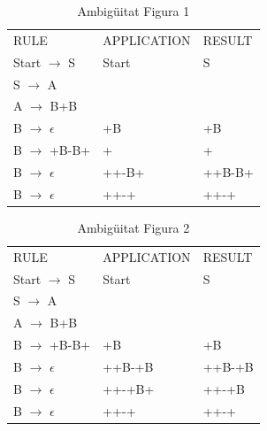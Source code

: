 \documentclass[12pt,a4paper]{report}
\begin{document}
\begin{table}[ht]
\caption{\label{tab:table-name} Ambigüitat Figura 1}
\centering
\begin{tabular}{lll}
\hline
\hline
RULE                       & APPLICATION                        & RESULT \\
Start $\rightarrow$ S      & Start                              & S      \\
S $\rightarrow$ A          & \color{Blue}{S} & \color{Blue}{A}      \\
A $\rightarrow$ B+B        & \color{Blue}{A}                                  & \color{Blue}{B+B}    \\
B $\rightarrow$ $\epsilon$ & \color{Blue}{B}+B                                & +B     \\
B $\rightarrow$ +B-B+      & +\color{Blue}{B}                                 & +\color{Blue}{+B-B+} \\
B $\rightarrow$ $\epsilon$ & ++\color{Blue}{B}-B+                             & ++B-B+ \\
B $\rightarrow$ $\epsilon$ & ++-\color{Blue}{B}+                              & ++-+  \\ \hline
\end{tabular}
\end{table}

\begin{table}[ht]
\caption{\label{tab:table-name} Ambigüitat Figura 2}
\centering
\begin{tabular}{lll}
\hline
\hline
RULE                       & APPLICATION                        & RESULT  \\
Start $\rightarrow$ S      & Start                              & S       \\
S $\rightarrow$ A          & \color{Blue}{S} & \color{Blue}{A}       \\
A $\rightarrow$ B+B        & \color{Blue}{A}                                  & \color{Blue}{B+B}     \\
B $\rightarrow$ +B-B+      & \color{Blue}{B}+B                                & \color{Blue}{+B+B-}+B \\
B $\rightarrow$ $\epsilon$ & +\color{Blue}{B}+B-+B                            & ++B-+B  \\
B $\rightarrow$ $\epsilon$ & ++\color{Blue}{B}-+B+                            & ++-+B   \\
B $\rightarrow$ $\epsilon$ & ++-+\color{Blue}{B}                              & ++-+
\end{tabular}
\end{table}
\end{document}
